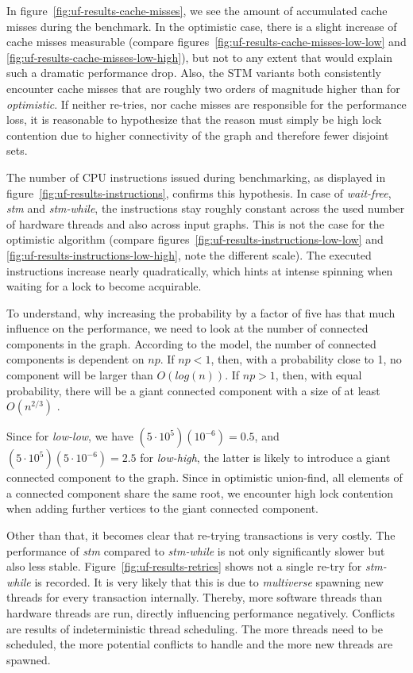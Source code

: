 In figure~\ref{fig:uf-results-cache-misses}, we see the amount of accumulated
cache misses during the benchmark. In the optimistic case, there is a slight
increase of cache misses measurable (compare
figures~\ref{fig:uf-results-cache-misses-low-low} and
\ref{fig:uf-results-cache-misses-low-high}), but not to any extent that would
explain such a dramatic performance drop. Also, the STM variants both
consistently encounter cache misses that are roughly two orders of magnitude
higher than for \emph{optimistic}. If neither re-tries, nor cache misses are
responsible for the performance loss, it is reasonable to hypothesize that the
reason must simply be high lock contention due to higher connectivity of the
graph and therefore fewer disjoint sets.

The number of CPU instructions issued during benchmarking, as displayed in
figure~\ref{fig:uf-results-instructions}, confirms this hypothesis. In case of
\emph{wait-free}, \emph{stm} and \emph{stm-while}, the instructions stay roughly
constant across the used number of hardware threads and also across input
graphs. This is not the case for the optimistic algorithm (compare
figures~\ref{fig:uf-results-instructions-low-low} and
\ref{fig:uf-results-instructions-low-high}, note the different scale). The
executed instructions increase nearly quadratically, which hints at intense
spinning when waiting for a lock to become acquirable.

To understand, why increasing the probability by a factor of five has that much
influence on the performance, we need to look at the number of connected
components in the graph. According to the \citet{Erdos1959Random} model, the
number of connected components is dependent on $np$. If $np < 1$, then, with a
probability close to 1, no component will be larger than $O(log(n))$. If $np >
1$, then, with equal probability, there will be a giant connected component with
a size of at least $O(n^{2 / 3})$ \cite{Erdos1959Random, Erdos1960On,
  Bollobas1984Evolution}.

Since for \emph{low-low}, we have $(5 \cdot 10^5)(10^{-6}) = 0.5$, and $(5 \cdot
10^5)(5 \cdot 10^{-6}) = 2.5$ for \emph{low-high}, the latter is likely to
introduce a giant connected component to the graph. Since in optimistic
union-find, all elements of a connected component share the same root, we
encounter high lock contention when adding further vertices to the giant
connected component.

Other than that, it becomes clear that re-trying transactions is very
costly. The performance of \emph{stm} compared to \emph{stm-while} is not only
significantly slower but also less stable. Figure~\ref{fig:uf-results-retries}
shows not a single re-try for \emph{stm-while} is recorded. It is very likely
that this is due to \emph{multiverse} spawning new threads for every transaction
internally. Thereby, more software threads than hardware threads are run,
directly influencing performance negatively. Conflicts are results of
indeterministic thread scheduling. The more threads need to be scheduled, the
more potential conflicts to handle and the more new threads are spawned.

